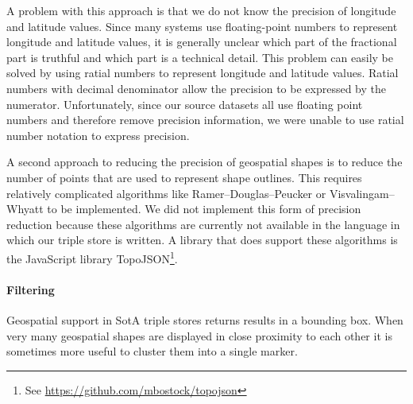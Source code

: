 \documentclass[a4paper]{scrartcl}
\newcommand{\seeUrl}[1]{\footnote{See \mbox{\url{#1}}}}
\newcommand{\textt}[1]{{\small \texttt{#1}}}
\begin{document}
A problem with this approach is that we do not know the precision of
longitude and latitude values.  Since many systems use floating-point
numbers to represent longitude and latitude values, it is generally
unclear which part of the fractional part is truthful and which part
is a technical detail.  This problem can easily be solved by using
ratial numbers to represent longitude and latitude values.  Ratial
numbers with decimal denominator allow the precision to be expressed
by the numerator.  Unfortunately, since our source datasets all use
floating point numbers and therefore remove precision information, we
were unable to use ratial number notation to express precision.

A second approach to reducing the precision of geospatial shapes is to
reduce the number of points that are used to represent shape outlines.
This requires relatively complicated algorithms like
Ramer–Douglas–Peucker or Visvalingam–Whyatt to be implemented.  We did
not implement this form of precision reduction because these
algorithms are currently not available in the language in which our
triple store is written.  A library that does support these algorithms
is the JavaScript library
TopoJSON\seeUrl{https://github.com/mbostock/topojson}.


\paragraph{Filtering}
Geospatial support in SotA triple stores returns results in a bounding
box.  When very many geospatial shapes are displayed in close
proximity to each other it is sometimes more useful to cluster them
into a single marker.  

\end{document}
